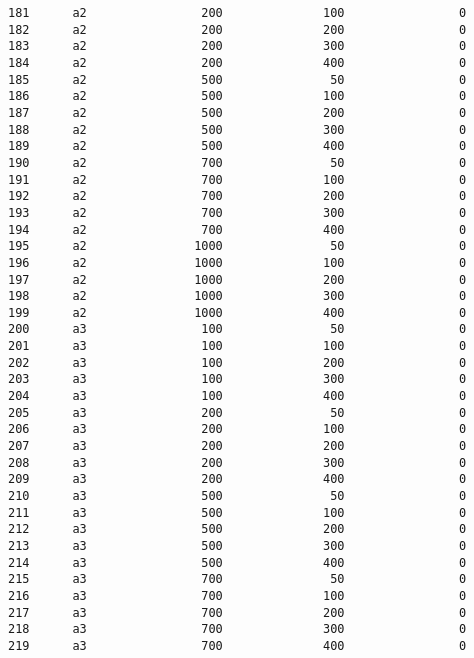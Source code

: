 \documentclass[11pt]{article}
\begin{document}
\begin{Verbatim}[commandchars=\\\{\}]
181      a2                200              100                0   
182      a2                200              200                0   
183      a2                200              300                0   
184      a2                200              400                0   
185      a2                500               50                0   
186      a2                500              100                0   
187      a2                500              200                0   
188      a2                500              300                0   
189      a2                500              400                0   
190      a2                700               50                0   
191      a2                700              100                0   
192      a2                700              200                0   
193      a2                700              300                0   
194      a2                700              400                0   
195      a2               1000               50                0   
196      a2               1000              100                0   
197      a2               1000              200                0   
198      a2               1000              300                0   
199      a2               1000              400                0   
200      a3                100               50                0   
201      a3                100              100                0   
202      a3                100              200                0   
203      a3                100              300                0   
204      a3                100              400                0   
205      a3                200               50                0   
206      a3                200              100                0   
207      a3                200              200                0   
208      a3                200              300                0   
209      a3                200              400                0   
210      a3                500               50                0   
211      a3                500              100                0   
212      a3                500              200                0   
213      a3                500              300                0   
214      a3                500              400                0   
215      a3                700               50                0   
216      a3                700              100                0   
217      a3                700              200                0   
218      a3                700              300                0   
219      a3                700              400                0   

\end{Verbatim}
\end{document}
